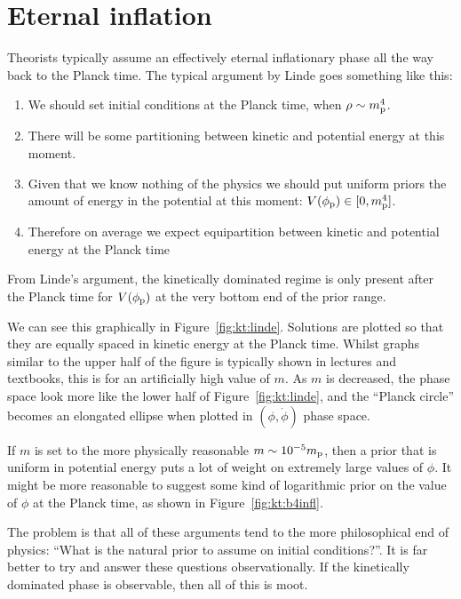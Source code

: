 \section{Eternal inflation}
Theorists typically assume an effectively eternal inflationary phase all the way back to the Planck time.  
The typical argument by Linde goes something like this:
\begin{enumerate}
  \item We should set initial conditions at the Planck time, when
    \(\rho\sim m_{\mathrm{p}}^4\).
  \item There will be some partitioning between kinetic and potential
    energy at this moment.
  \item Given that we know nothing of the physics we should put
    uniform priors the amount of energy in the potential at this
    moment: \(V(\phi_{\mathrm{p}})\in[0,m_{\mathrm{p}}^4]\).
  \item Therefore on average we expect equipartition between kinetic
    and potential energy at the Planck time
\end{enumerate}

From Linde's argument, the kinetically dominated regime is only present
after the Planck time for \(V(\phi_{\mathrm{p}})\) at the very bottom end of the
prior range.

We can see this graphically in Figure~\ref{fig:kt:linde}. Solutions are plotted so that they are equally spaced in kinetic energy at the Planck time. Whilst graphs similar to the upper half of the figure is typically shown in lectures and textbooks, this is for an artificially high value of \(m\). As \(m\) is decreased, the phase space look more like the lower half of Figure~\ref{fig:kt:linde}, and the ``Planck circle'' becomes an elongated ellipse when plotted in \((\phi, \dot{\phi})\) phase space. 

If \(m\) is set to the more physically reasonable \(m\sim10^{-5}m_{\mathrm{p}}\), then  a prior that is uniform in potential energy puts a lot of weight on extremely large values of \(\phi\). It might be more reasonable to suggest some kind of logarithmic prior on the value of \(\phi\) at the Planck time, as shown in Figure~\ref{fig:kt:b4infl}.

The problem is that all of these arguments tend to the more philosophical end of physics: ``What is the natural prior to assume on initial conditions?''. It is far better to try and answer these questions observationally. If the kinetically dominated phase is observable, then all of this is moot.


